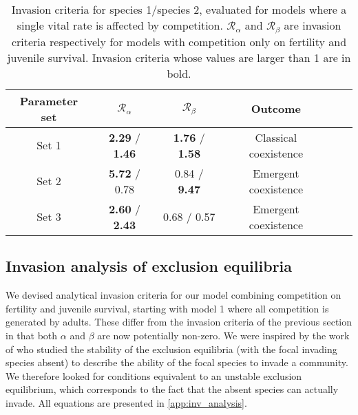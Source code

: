 \documentclass{article}
\begin{document}
\begin{table}[h]
\centering
\begin{tabular}{|c|c|c|c|c|c|}
Parameter set & $\mathcal{R}_\alpha$ & $\mathcal{R}_\beta$ & Outcome \\ 
  \hline
Set 1 & \textbf{2.29} / \textbf{1.46} & \textbf{1.76} / \textbf{1.58} & Classical coexistence \\ 
Set 2 & \textbf{5.72} / 0.78 & 0.84 / \textbf{9.47} & Emergent coexistence \\ 
Set 3 & \textbf{2.60} / \textbf{2.43} & 0.68 / 0.57 & Emergent coexistence \\ 
\end{tabular}
\caption{Invasion criteria for species 1/species 2, evaluated for models where a single vital rate is affected by competition. $\mathcal{R}_\alpha$ and $\mathcal{R}_\beta$ are invasion criteria respectively for models with competition only on fertility and juvenile survival. Invasion criteria whose values are larger than 1 are in bold.}
\label{tab:3param_sets_inv_crit}
\end{table}

\subsection{Invasion analysis of 
exclusion equilibria}\label{sec:mat_met_inv_analysis}

We devised analytical invasion criteria for our model combining competition on fertility and juvenile survival, starting with model 1 where all competition is generated by adults. These differ from the invasion criteria of the previous section in that both $\alpha$ and $\beta$ are now potentially non-zero. We were inspired by the work of \citet{cushing1998introduction, cushing2008matrix} who studied the stability of the exclusion equilibria (with the focal invading species absent) to describe the ability of the focal species to invade a community. We therefore looked for conditions equivalent to an unstable exclusion equilibrium, which corresponds to the fact that the absent species can actually invade. All equations are presented in \ref{app:inv_analysis}.
\end{document}
